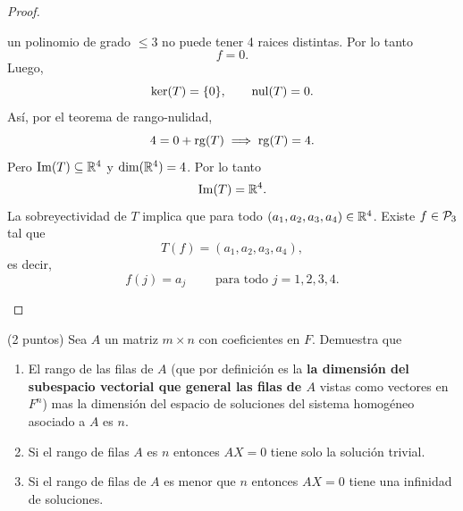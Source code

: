 \documentclass[12pt,a4paper]{article}
\begin{document}
\begin{proof}
\begin{enumerate}
            un polinomio de grado $\leq3$ no puede tener 4 raices distintas. Por lo tanto
            \begin{equation*}
                f=0.
            \end{equation*}
            Luego,
            \begin{equation*}
                \ker(T)=\{0\},\qquad\operatorname{nul}(T)=0.
            \end{equation*}
            Así, por el teorema de rango-nulidad,
            \begin{equation*}
                4=0+\operatorname{rg}(T)\implies\operatorname{rg}(T)=4.
            \end{equation*}
            Pero $\Im(T)\subseteq\mathbb{R}^{4}$ y $\dim(\mathbb{R}^{4})=4$. Por lo tanto
            \begin{equation*}
                \Im(T)=\mathbb{R}^{4}.
            \end{equation*}
            La sobreyectividad de $T$ implica que para todo $(a_{1},a_{2},a_{3},a_{4})\in\mathbb{R}^{4}$.
            Existe $f\in\mathcal{P}_{3}$ tal que
            \begin{equation*}
                T(f)=(a_{1},a_{2},a_{3},a_{4}),
            \end{equation*}
            es decir,
            \begin{equation*}
                f(j)=a_{j}\qquad\text{ para todo }j=1,2,3,4.
            \end{equation*}
        \end{enumerate}
    \end{proof}

    \begin{mdframed}[style=mdpinkbox,frametitle={Ejercicio 2}]
        (2 puntos) Sea $A$ un matriz $m\times n$ con coeficientes en $F$. Demuestra que
        \begin{enumerate}
            \item[(a)] El rango de las filas de $A$ (que por definición es la \textbf{la dimensión
            del subespacio vectorial que general las filas de $A$} vistas como vectores en $F^{n}$)
            mas la dimensión del espacio de soluciones del sistema homogéneo asociado a $A$ es $n$.
            \item[(b)] Si el rango de filas $A$ es $n$ entonces $AX=0$ tiene solo la solución trivial.
            \item[(c)] Si el rango de filas de $A$  es menor que $n$ entonces $AX=0$ tiene una infinidad
            de soluciones.
        \end{enumerate}
    \end{mdframed}
\end{document}
